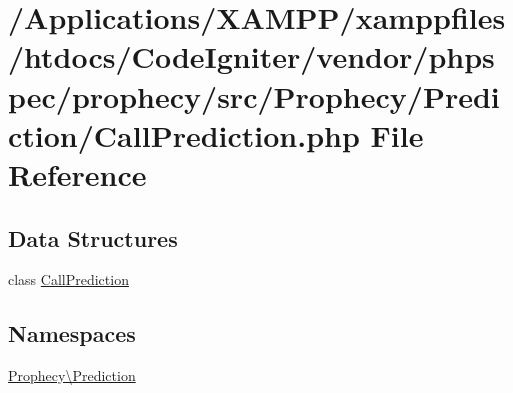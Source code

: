 \hypertarget{_call_prediction_8php}{}\section{/\+Applications/\+X\+A\+M\+P\+P/xamppfiles/htdocs/\+Code\+Igniter/vendor/phpspec/prophecy/src/\+Prophecy/\+Prediction/\+Call\+Prediction.php File Reference}
\label{_call_prediction_8php}
\subsection*{Data Structures}
\begin{DoxyCompactItemize}
\item 
class \mbox{\hyperlink{class_prophecy_1_1_prediction_1_1_call_prediction}{Call\+Prediction}}
\end{DoxyCompactItemize}
\subsection*{Namespaces}
\begin{DoxyCompactItemize}
\item 
 \mbox{\hyperlink{namespace_prophecy_1_1_prediction}{Prophecy\textbackslash{}\+Prediction}}
\end{DoxyCompactItemize}
